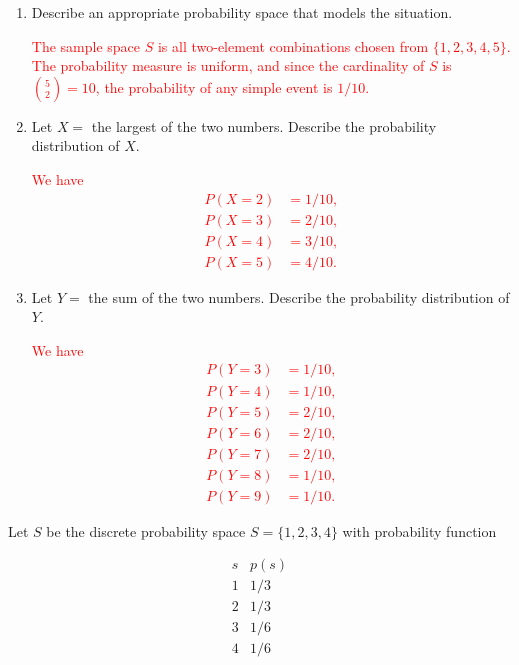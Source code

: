 \documentclass[12pt,reqno]{amsart}
\begin{document}
\medskip
\begin{enumerate}
\item Describe an appropriate probability space that models the situation.
    
\bigskip
\textcolor{red}{The sample space $S$ is all two-element combinations chosen from $\{1,2,3,4,5\}$. The probability measure is uniform, and since the cardinality of $S$ is $\binom{5}{2} = 10$, the probability of any simple event is $1/10$.}
\bigskip

\item Let $X = $ the largest of the two numbers. Describe the probability distribution of $X$.
    
\bigskip
\textcolor{red}{We have
	\begin{align*}
	P(X=2) &= 1/10, \\
	P(X=3) &= 2/10, \\
	P(X=4) &= 3/10, \\
	P(X=5) &= 4/10.
	\end{align*}}
\bigskip

\item Let $Y = $ the sum of the two numbers. Describe the probability distribution of $Y$.
    
\bigskip
\textcolor{red}{We have
	\begin{align*}
	P(Y=3) &= 1/10, \\
	P(Y=4) &= 1/10, \\
	P(Y=5) &= 2/10, \\
	P(Y=6) &= 2/10, \\
	P(Y=7) &= 2/10, \\
	P(Y=8) &= 1/10, \\
	P(Y=9) &= 1/10.
	\end{align*}}
\end{enumerate}















\bigskip
\prob Let $S$ be the discrete probability space $S = \{1,2,3,4\}$ with probability function

	\[
	\begin{array}{c|c}
	s & p(s) \\ \hline
	1 & 1/3\\
	2 & 1/3\\
	3 & 1/6\\
	4 & 1/6
	\end{array}
	\]
\end{document}
